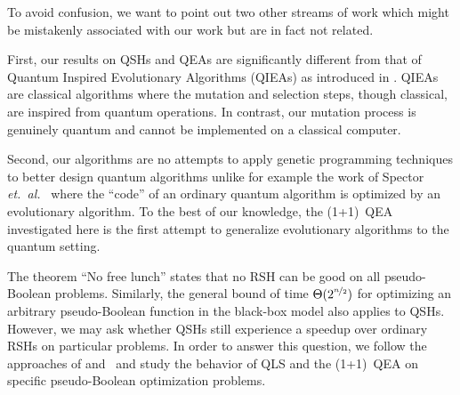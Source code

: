 \documentclass[a4paper,11pt]{article}
\begin{document}
To avoid confusion, we want to point out two other streams of work which might be mistakenly associated with our work but are in fact not related. 

First, our results on QSHs and QEAs are significantly different from that of Quantum Inspired Evolutionary Algorithms (QIEAs) as introduced in \cite{HanK02}. QIEAs are classical algorithms where the mutation and selection steps, though classical, are inspired from quantum operations. In contrast, our mutation process is genuinely quantum and cannot be implemented on a classical computer. 

Second, our algorithms are no attempts to apply genetic programming techniques to better design quantum algorithms unlike for example the work of Spector \emph{et.~al.}~\cite{SpectorBBS99} where the ``code'' of an ordinary quantum algorithm is optimized by an evolutionary algorithm. To the best of our knowledge, the (1+1)~QEA investigated here is the first attempt to generalize evolutionary algorithms to the quantum setting.

The theorem ``No free lunch'' states that no RSH can be good on all pseudo-Boolean problems. Similarly, the general bound of time $\Theta(2^{\nicefrac{n}{2}})$ for optimizing an arbitrary pseudo-Boolean function in the black-box model also applies to QSHs. However, we may ask whether QSHs still experience a speedup over ordinary RSHs on particular problems. In order to answer this question, we follow the approaches of \cite{BeyerSW02} and~\cite{djwea02} and study the behavior of QLS and the (1+1)~QEA on specific pseudo-Boolean optimization problems.
\end{document}
